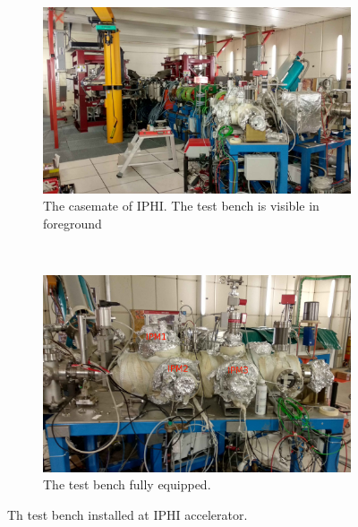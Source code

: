 \begin{figure}[!ht]
	\begin{subfigure}{0.5\textwidth}
		\includegraphics[width=\textwidth]{04_IPHI_Test/figures/fig000_IPHI_tb1.jpg}
		\caption{The casemate of IPHI. The test bench is visible in foreground}
		\label{}
	\end{subfigure}
	~
	\begin{subfigure}{0.5\textwidth}
		\includegraphics[width=\textwidth]{04_IPHI_Test/figures/fig000_IPHI_tb2.jpg}
		\caption{The test bench fully equipped.}
		\label{}
	\end{subfigure}
	\caption[The test bench installed at IPHI accelerator]{Th test bench installed at IPHI accelerator.}
	\label{chap4:IPHI_tb}
\end{figure}
